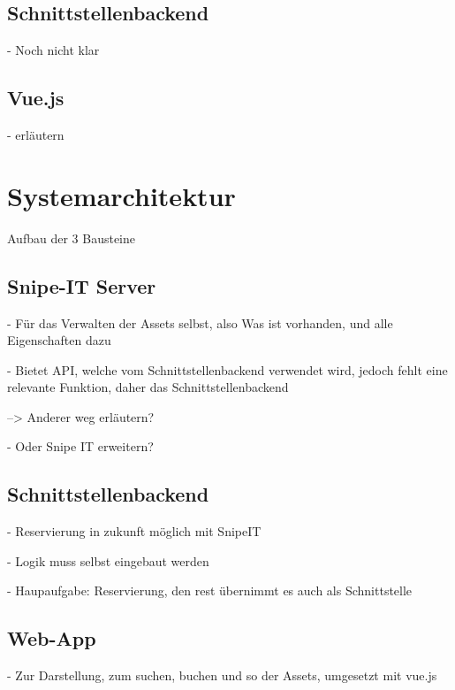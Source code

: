 \subsection{Schnittstellenbackend}
- Noch nicht klar

\subsection{Vue.js}
- erläutern


\section{Systemarchitektur}
Aufbau der 3 Bausteine

\subsection{Snipe-IT Server}
- Für das Verwalten der Assets selbst, also Was ist vorhanden, und alle
Eigenschaften dazu

- Bietet API, welche vom Schnittstellenbackend verwendet wird, jedoch fehlt eine
relevante Funktion, daher das Schnittstellenbackend

--> Anderer weg erläutern?

- Oder Snipe IT erweitern?

\subsection{Schnittstellenbackend}
- Reservierung in zukunft möglich mit SnipeIT

- Logik muss selbst eingebaut werden

- Haupaufgabe: Reservierung, den rest übernimmt es auch als Schnittstelle

\subsection{Web-App}
- Zur Darstellung, zum suchen, buchen und so der Assets, umgesetzt mit vue.js

